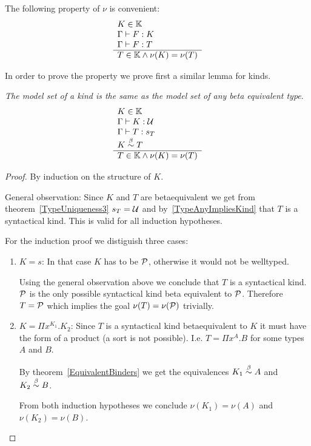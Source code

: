 The following property of $\nu$ is convenient:
$$
    \begin{array}{l} 
        K \in \mathbb{K}
        \\
        \Gamma \vdash F: K
        \\
        \Gamma \vdash F: T
     \\ \hline 
        T \in \mathbb{K} \land \nu(K) = \nu(T)
    \end{array}
$$


In order to prove the property we prove first a similar lemma for kinds.

\begin{lemma}
    \label{ModelEquivalentKinds}
    \emph{The model set of a kind is the same as the model set of any beta
    equivalent type}.
    $$
    \begin{array}{l} 
        K \in \mathbb{K}
        \\
        \Gamma \vdash K: {\cal U}
        \\
        \Gamma \vdash T: s_T
        \\
        K \stackrel{\beta}{\sim} T
     \\ \hline 
        T \in \mathbb{K} \land \nu(K) = \nu(T)
    \end{array}
    $$

    \begin{proof}
        By induction on the structure of $K$.

        General observation: Since $K$ and $T$ are betaequivalent we get from
        theorem~\ref{TypeUniqueness3} $s_T = {\cal U}$ and
        by~\ref{TypeAnyImpliesKind} that $T$ is a syntactical kind. This is
        valid for all induction hypotheses.

        For the induction proof we distiguish three cases:
        \begin{enumerate}
        \item $K = s$: In that case $K$ has to be ${\cal P}$, otherwise it would
            not be welltyped.

            Using the general observation above we conclude that
            $T$ is a syntactical kind. ${\cal P}$ is the only possible syntactical
                kind beta equivalent to ${\cal P}$. Therefore $T = {\cal P}$ which
                implies the goal $\nu(T) = \nu({\cal P})$ trivially.

        \item $K = \Pi x^{K_1}. K_2$:
            Since $T$ is a syntactical kind betaequivalent to $K$ it must have
                the form of a product (a sort is not possible). I.e. $T = \Pi
                x^A.B$ for some types $A$ and $B$.

            By theorem~\ref{EquivalentBinders} we get the equivalences $K_1
                \stackrel{\beta}{\sim} A$ and $K_2 \stackrel{\beta}{\sim} B$.

            From both induction hypotheses we conclude $\nu(K_1) = \nu(A)$ and
            $\nu(K_2) = \nu(B)$.



\end{enumerate}
\end{proof}
\end{lemma}
